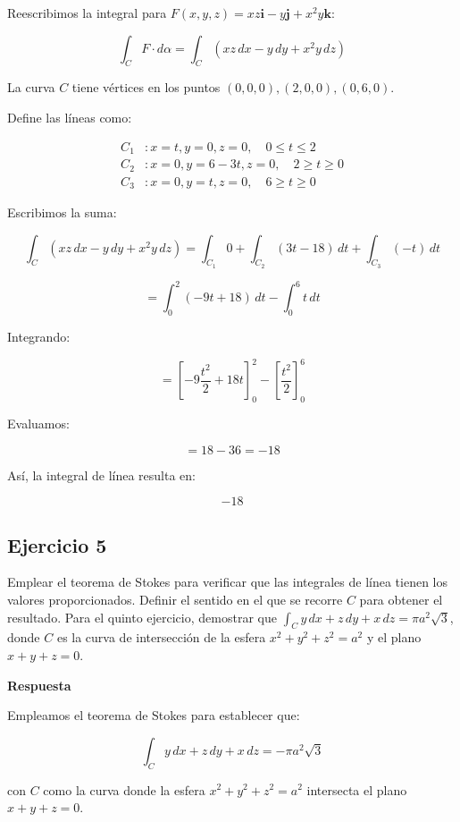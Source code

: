 \documentclass{report}
\begin{document}
Reescribimos la integral para \( F(x, y, z) = xz \mathbf{i} - y \mathbf{j} + x^2 y \mathbf{k} \):

\[
\int_C F \cdot d \alpha = \int_C \left( xz \, dx - y \, dy + x^2 y \, dz \right)
\]

La curva \( C \) tiene vértices en los puntos \( (0,0,0), (2,0,0), (0,6,0) \).

Define las líneas como:

\[
\begin{aligned}
C_1 &: x = t, y = 0, z = 0, \quad 0 \leq t \leq 2 \\
C_2 &: x = 0, y = 6 - 3t, z = 0, \quad 2 \geq t \geq 0 \\
C_3 &: x = 0, y = t, z = 0, \quad 6 \geq t \geq 0
\end{aligned}
\]

Escribimos la suma:

\[
\int_C \left( xz \, dx - y \, dy + x^2 y \, dz \right) = \int_{C_1} 0 + \int_{C_2} \left( 3t - 18 \right) \, dt + \int_{C_3} \left( -t \right) \, dt
\]

\[
= \int_{0}^{2} \left( -9t + 18 \right) \, dt - \int_{0}^{6} t \, dt
\]

Integrando:

\[
= \left[ -9 \frac{t^2}{2} + 18t \right]_{0}^{2} - \left[ \frac{t^2}{2} \right]_{0}^{6}
\]

Evaluamos:

\[
= 18 - 36 = -18
\]

Así, la integral de línea resulta en:

\[
{-18}
\]

\subsection*{Ejercicio 5}
Emplear el teorema de Stokes para verificar que las integrales de línea tienen los valores proporcionados. Definir el sentido en el que se recorre \( C \) para obtener el resultado.
Para el quinto ejercicio, demostrar que \(\int_C y \, dx + z \, dy + x \, dz = \pi a^2 \sqrt{3}\), donde \( C \) es la curva de intersección de la esfera \( x^2 + y^2 + z^2 = a^2 \) y el plano \( x + y + z = 0 \).

\textbf{Respuesta}


Empleamos el teorema de Stokes para establecer que:

\[
\int_C y \, dx + z \, dy + x \, dz = -\pi a^2 \sqrt{3}
\]

con \( C \) como la curva donde la esfera \( x^2 + y^2 + z^2 = a^2 \) intersecta el plano \( x + y + z = 0 \).
\end{document}
